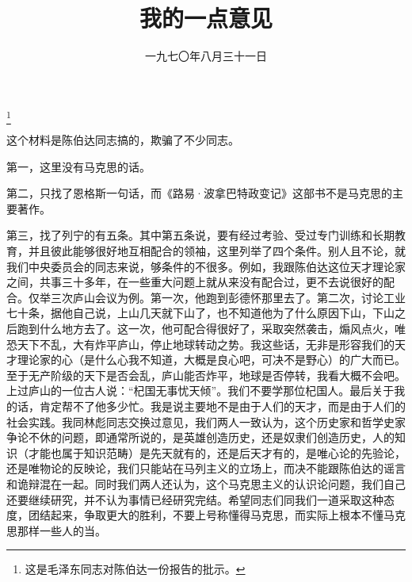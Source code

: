 
\title{我的一点意见}
\date{一九七〇年八月三十一日}
\thanks{这是毛泽东同志对陈伯达一份报告的批示。}
\maketitle


这个材料是陈伯达同志搞的，欺骗了不少同志。

第一，这里没有马克思的话。

第二，只找了恩格斯一句话，而《路易·波拿巴特政变记》这部书不是马克思的主要著作。

第三，找了列宁的有五条。其中第五条说，要有经过考验、受过专门训练和长期教育，并且彼此能够很好地互相配合的领袖，这里列举了四个条件。别人且不论，就我们中央委员会的同志来说，够条件的不很多。例如，我跟陈伯达这位天才理论家之间，共事三十多年，在一些重大问题上就从来没有配合过，更不去说很好的配合。仅举三次庐山会议为例。第一次，他跑到彭德怀那里去了。第二次，讨论工业七十条，据他自己说，上山几天就下山了，也不知道他为了什么原因下山，下山之后跑到什么地方去了。这一次，他可配合得很好了，采取突然袭击，煽风点火，唯恐天下不乱，大有炸平庐山，停止地球转动之势。我这些话，无非是形容我们的天才理论家的心（是什么心我不知道，大概是良心吧，可决不是野心）的广大而已。至于无产阶级的天下是否会乱，庐山能否炸平，地球是否停转，我看大概不会吧。上过庐山的一位古人说：“杞国无事忧天倾”。我们不要学那位杞国人。最后关于我的话，肯定帮不了他多少忙。我是说主要地不是由于人们的天才，而是由于人们的社会实践。我同林彪同志交换过意见，我们两人一致认为，这个历史家和哲学史家争论不休的问题，即通常所说的，是英雄创造历史，还是奴隶们创造历史，人的知识（才能也属于知识范畴）是先天就有的，还是后天才有的，是唯心论的先验论，还是唯物论的反映论，我们只能站在马列主义的立场上，而决不能跟陈伯达的谣言和诡辩混在一起。同时我们两人还认为，这个马克思主义的认识论问题，我们自己还要继续研究，并不认为事情已经研究完结。希望同志们同我们一道采取这种态度，团结起来，争取更大的胜利，不要上号称懂得马克思，而实际上根本不懂马克思那样一些人的当。

